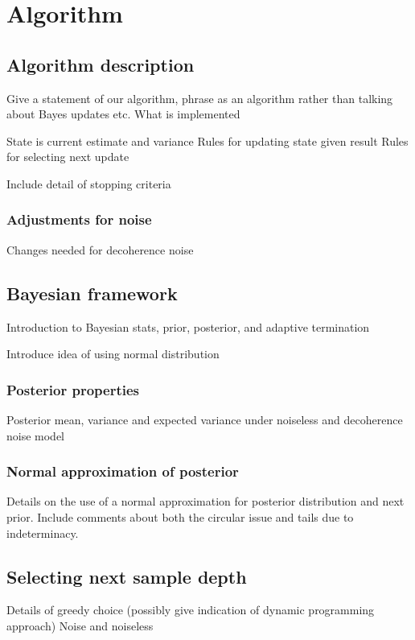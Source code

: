
\section{Algorithm}

\subsection{Algorithm description}
Give a statement of our algorithm, phrase as an algorithm rather than talking about Bayes updates etc. What is implemented

State is current estimate and variance
Rules for updating state given result
Rules for selecting next update

Include detail of stopping criteria

\subsubsection{Adjustments for noise}
Changes needed for decoherence noise

\subsection{Bayesian framework}
Introduction to Bayesian stats, prior, posterior, and adaptive termination

Introduce idea of using normal distribution 


\subsubsection{Posterior properties}
Posterior mean, variance and expected variance under noiseless and decoherence noise model

\subsubsection{Normal approximation of posterior}
Details on the use of a normal approximation for posterior distribution and next prior.
Include comments about both the circular issue and tails due to indeterminacy. 

\subsection{Selecting next sample depth}
Details of greedy choice (possibly give indication of dynamic programming approach)
Noise and noiseless

